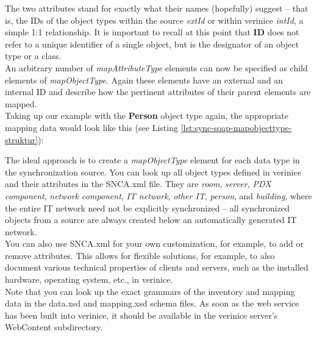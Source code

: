 \documentclass[a4paper,10pt]{book}
\begin{document}
\lstset{language=XML}



The two attributes stand for exactly what their names (hopefully) suggest – that is, the IDs of
the object types within the source \textit{extId} or within verinice \textit{intId}, a simple 1:1 relationship.
It is important to recall at this point that \textbf{ID} does not refer to a unique identifier of a single object,
but is the designator of an object type or a class.
\newline\\
An arbitrary number of \textit{mapAttributeType} elements can now be specified as child elements of
\textit{mapObjectType}. Again these elements have an external and an internal ID and describe how
the pertinent attributes of their parent elements are mapped.
\newline\\
Taking up our example with the \textbf{Person} object type again, the appropriate mapping data would look like this (see Listing \ref{lst:sync-soap-mapobjecttype-struktur}):
\newline
\lstset{language=XML}



The ideal approach is to create a \textit{mapObjectType} element for each data type in the synchronization
source. You can look up all object types defined in verinice and their attributes in the SNCA.xml file. They are
\textit{room}, \textit{server}, \textit{PDX component}, \textit{network component}, \textit{IT network}, \textit{other IT}, \textit{person},
and \textit{building}, where the entire IT network need not be explicitly synchronized – all synchronized objects from a
source are always created below an automatically generated IT network.
\newline\\
You can also use SNCA.xml for your own customization, for example, to add or remove attributes. This allows for
flexible solutions, for example, to also document various technical properties of clients and servers, such as
the installed hardware, operating system, etc., in verinice.
\newline\\
Note that you can look up the exact grammars of the inventory and mapping data in the data.xsd and mapping.xsd schema
files. As soon as the web service has been built into verinice, it should be available in the verinice server's
WebContent subdirectory.
\end{document}
